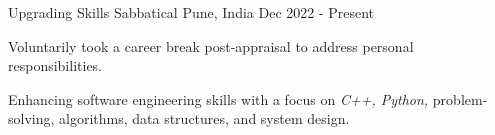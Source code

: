 


\begin{cventries}

\cventry
{Upgrading Skills}
{Sabbatical}
{Pune, India}
{Dec 2022 - Present}
{
\begin{cvitems}
\item {Voluntarily took a career break post-appraisal to address personal responsibilities.}
\item {Enhancing software engineering skills with a focus on \textit{C++, Python,} problem-solving, algorithms, data structures, and system design.}
\end{cvitems}
}


\end{cventries}
